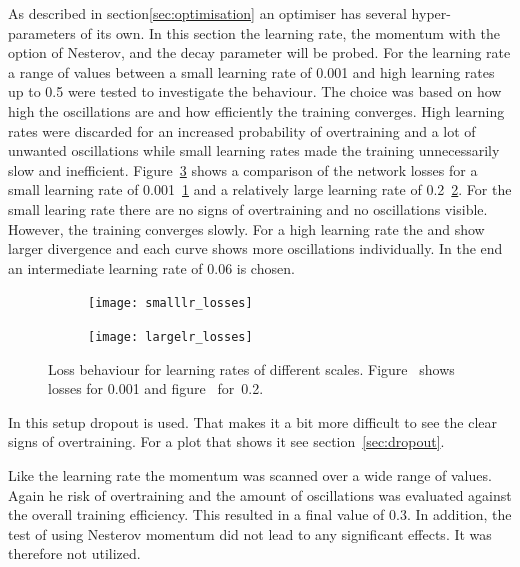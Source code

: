 As described in section\ref{sec:optimisation} an optimiser has several hyper-parameters of its own. In this section the learning rate, the momentum with the option of Nesterov, and the decay parameter will be probed.
For the learning rate a range of values between a small learning rate of \num{0.001} and high learning rates up to \num{0.5} were tested to investigate the behaviour. The choice was based on how high the oscillations are and how efficiently the training converges. High learning rates were discarded for an increased probability of overtraining and a lot of unwanted oscillations while small learning rates made the training unnecessarily slow and inefficient. Figure~\ref{fig:lr} shows a comparison of the network losses for a small learning rate of \num{0.001}~\ref{fig:lr:small} and a relatively large learning rate of \num{0.2}~\ref{fig:lr:large}. For the small learing rate there are no signs of overtraining and no oscillations visible. However, the training converges slowly. For a high learning rate the \losstrain and \losstest show larger divergence and each curve shows more oscillations individually. In the end an intermediate learning rate of \num{0.06} is chosen.

\begin{figure}[htbp]
    \centering
    \begin{subfigure}[b]{0.48\textwidth}
        \texttt{[image: smalllr\_losses]}
        \caption{}
        \label{fig:lr:small}
    \end{subfigure}
\quad
    \begin{subfigure}[b]{0.48\textwidth}
        \texttt{[image: largelr\_losses]}
        \caption{}
        \label{fig:lr:large}
    \end{subfigure}
    \caption[Classifier loss for different learning rates]{Loss behaviour for learning rates of different scales. Figure~ shows losses for \num{0.001} and figure~ for~\num{0.2}.}
	\label{fig:lr}
\end{figure}

In this setup dropout is used. That makes it a bit more difficult to see the clear signs of overtraining. For a plot that shows it see section~\ref{sec:dropout}.

Like the learning rate the momentum was scanned over a wide range of values. Again he risk of overtraining and the amount of oscillations was evaluated against the overall training efficiency. This resulted in a final value of \num{0.3}. In addition, the test of using Nesterov momentum did not lead to any significant effects. It was therefore not utilized.


